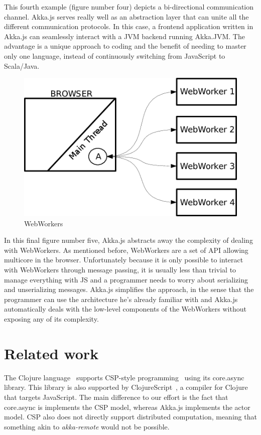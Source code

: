 \documentclass{sig-alternate}
\begin{document}
This fourth example (figure number four) depicts a bi-directional communication channel. Akka.js serves really well as an abstraction layer
that can unite all the different communication protocols. In this case, a frontend application written in Akka.js
can seamlessly interact with a JVM backend running Akka.JVM. The advantage is a unique approach to coding and
the benefit of needing to master only one language, instead of continuously switching from JavaScript to Scala/Java.

\begin{figure}
\centering
\includegraphics[scale=0.3]{5.png}
\caption{WebWorkers}
\label{fig:ww}
\end{figure}

In this final figure number five, Akka.js abstracts away the complexity of dealing with WebWorkers. As mentioned before, WebWorkers
are a set of API allowing multicore in the browser. Unfortunately because it is only possible to interact with WebWorkers
through message passing, it is usually less than trivial to manage everything with JS and a programmer needs to worry
about serializing and unserializing messages. Akka.js simplifies the approach, in the sense that the programmer can use
the architecture he's already familiar with and Akka.js automatically deals with the low-level components of the WebWorkers
without exposing any of its complexity.


\section{Related work}\label{sec:related}

The Clojure language~\cite{Halloway09} supports CSP-style programming~\cite{Hoare78} using its
core.async library. This library is also supported by
ClojureScript~\cite{ClojureScript}, a compiler for Clojure that targets
JavaScript. The main difference to our effort is the fact that core.async is
implements the CSP model, whereas Akka.js implements the actor model. CSP also does not directly support distributed computation, meaning that something akin to \textit{akka-remote} would not be possible.
\end{document}
